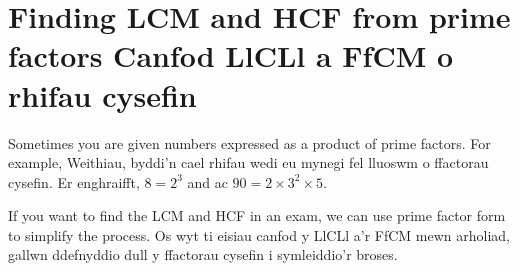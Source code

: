 
\section{\en Finding LCM and HCF from prime factors \cy Canfod LlCLl a FfCM o rhifau cysefin}
\label{sec:finding-hcf-and-lcm-from-prime-factors}

\en Sometimes you are given numbers expressed as a product of prime factors. For example, 
\cy Weithiau, byddi'n cael rhifau wedi eu mynegi fel lluoswm o ffactorau cysefin. Er enghraifft, 
\bi $8 = 2^3$ \en and \cy ac $90 = 2 \times 3^2 \times 5$.

\en If you want to find the LCM and HCF in an exam, we can use prime factor form to simplify the process.
\cy Os wyt ti eisiau canfod y LlCLl a'r FfCM mewn arholiad, gallwn ddefnyddio dull y ffactorau cysefin i symleiddio'r broses.

